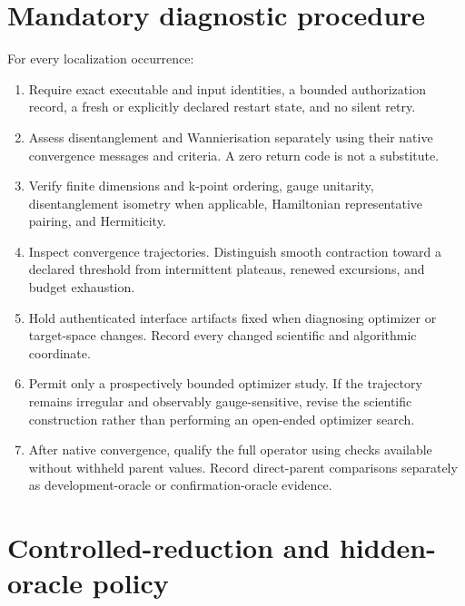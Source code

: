 \documentclass[11pt]{report}
\begin{document}
\chapter{Mandatory diagnostic procedure}

For every localization occurrence:

\begin{enumerate}
  \item Require exact executable and input identities, a bounded authorization record,
    a fresh or explicitly declared restart state, and no silent retry.
  \item Assess disentanglement and Wannierisation separately using their native
    convergence messages and criteria.  A zero return code is not a substitute.
  \item Verify finite dimensions and k-point ordering, gauge unitarity,
    disentanglement isometry when applicable, Hamiltonian representative pairing, and
    Hermiticity.
  \item Inspect convergence trajectories.  Distinguish smooth contraction toward a
    declared threshold from intermittent plateaus, renewed excursions, and budget
    exhaustion.
  \item Hold authenticated interface artifacts fixed when diagnosing optimizer or
    target-space changes.  Record every changed scientific and algorithmic coordinate.
  \item Permit only a prospectively bounded optimizer study.  If the trajectory remains
    irregular and observably gauge-sensitive, revise the scientific construction rather
    than performing an open-ended optimizer search.
  \item After native convergence, qualify the full operator using checks available
    without withheld parent values.  Record direct-parent comparisons separately as
    development-oracle or confirmation-oracle evidence.
\end{enumerate}

\chapter{Controlled-reduction and hidden-oracle policy}
\end{document}
